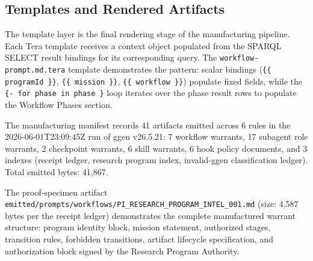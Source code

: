 \subsection{Templates and Rendered Artifacts}
\label{sec:research-prompt-manufactory-implementation-templates}

The template layer is the final rendering stage of the manufacturing pipeline. Each Tera
template receives a context object populated from the SPARQL SELECT result bindings for
its corresponding query. The \texttt{workflow-prompt.md.tera} template demonstrates the
pattern: scalar bindings (\texttt{\{\{ programId \}\}}, \texttt{\{\{ mission \}\}},
\texttt{\{\{ workflow \}\}}) populate fixed fields, while the \texttt{\{- for phase in
phase \}} loop iterates over the phase result rows to populate the Workflow Phases
section.

The manufacturing manifest records 41 artifacts emitted across 6 rules in the
2026-06-01T23:09:45Z run of ggen v26.5.21: 7 workflow warrants, 17 subagent role
warrants, 2 checkpoint warrants, 6 skill warrants, 6 hook policy documents, and 3
indexes (receipt ledger, research program index, invalid-ggen classification ledger).
Total emitted bytes: 41,867.

The proof-specimen artifact \texttt{emitted/prompts/workflows/PI\_RESEARCH\_PROGRAM\_INTEL\_001.md}
(size: 4,587 bytes per the receipt ledger) demonstrates the complete manufactured
warrant structure: program identity block, mission statement, authorized stages,
transition rules, forbidden transitions, artifact lifecycle specification, and
authorization block signed by the Research Program Authority.
